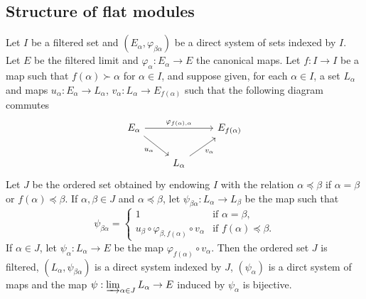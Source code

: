 \subsection{Structure of flat modules}
\begin{lemma}\label{filtered limit cofinal subset iso prop}
Let $I$ be a filtered set and $(E_\alpha,\varphi_{\beta\alpha})$ be a direct system of sets indexed by $I$. Let $E$ be the filtered limit and $\varphi_\alpha:E_\alpha\to E$ the canonical maps. Let $f:I\to I$ be a map such that $f(\alpha)\succ\alpha$ for $\alpha\in I$, and suppose given, for each $\alpha\in I$, a set $L_\alpha$ and maps $u_\alpha:E_\alpha\to L_\alpha$, $v_\alpha:L_\alpha\to E_{f(\alpha)}$ such that the following diagram commutes
\[\begin{tikzcd}
E_\alpha\ar[rr,"\varphi_{f(\alpha),\alpha}"]\ar[rd,swap,"u_\alpha"]&&E_{f(\alpha)}\\
&L_\alpha\ar[ru,swap,"v_\alpha"]
\end{tikzcd}\]
Let $J$ be the ordered set obtained by endowing $I$ with the relation $\alpha\preceq\beta$ if $\alpha=\beta$ or $f(\alpha)\preceq\beta$. If $\alpha,\beta\in J$ and $\alpha\preceq\beta$, let $\psi_{\beta\alpha}:L_\alpha\to L_\beta$ be the map such that
\[\psi_{\beta\alpha}=\begin{cases}
1&\text{if $\alpha=\beta$},\\
u_\beta\circ\varphi_{\beta,f(\alpha)}\circ v_\alpha&\text{if $f(\alpha)\preceq\beta$}.
\end{cases}
\]
If $\alpha\in J$, let $\psi_\alpha:L_\alpha\to E$ be the map $\varphi_{f(\alpha)}\circ v_\alpha$. Then the ordered set $J$ is filtered, $(L_\alpha,\psi_{\beta\alpha})$ is a direct system indexed by $J$, $(\psi_\alpha)$ is a dirct system of maps and the map $\psi:\varinjlim_{\alpha\in J} L_\alpha\to E$ induced by $\psi_\alpha$ is bijective.
\end{lemma}
